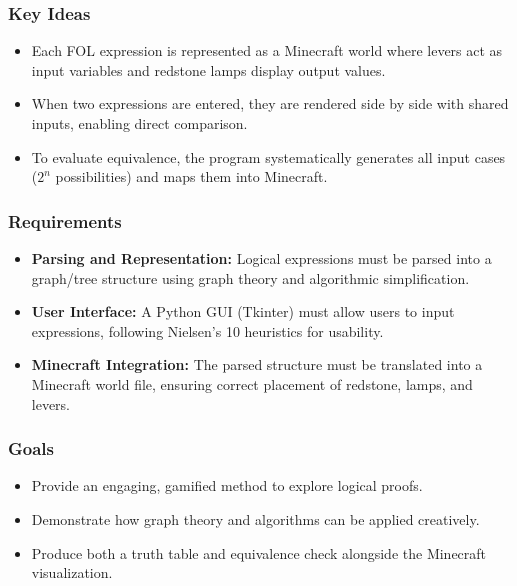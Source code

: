 \documentclass[11pt]{diazessay} %
\begin{document}
\subsubsection*{Key Ideas}
\begin{itemize}
    \item Each FOL expression is represented as a Minecraft world where levers act as input variables and redstone lamps display output values.  
    \item When two expressions are entered, they are rendered side by side with shared inputs, enabling direct comparison.  
    \item To evaluate equivalence, the program systematically generates all input cases ($2^n$ possibilities) and maps them into Minecraft.  
\end{itemize}

\subsubsection*{Requirements}
\begin{itemize}
    \item \textbf{Parsing and Representation:} Logical expressions must be parsed into a graph/tree structure using graph theory and algorithmic simplification.  
    \item \textbf{User Interface:} A Python GUI (Tkinter) must allow users to input expressions, following Nielsen’s 10 heuristics for usability.  
    \item \textbf{Minecraft Integration:} The parsed structure must be translated into a Minecraft world file, ensuring correct placement of redstone, lamps, and levers.  
\end{itemize}

\subsubsection*{Goals}
\begin{itemize}
    \item Provide an engaging, gamified method to explore logical proofs.  
    \item Demonstrate how graph theory and algorithms can be applied creatively.  
    \item Produce both a truth table and equivalence check alongside the Minecraft visualization.  
\end{itemize}


\end{document}
